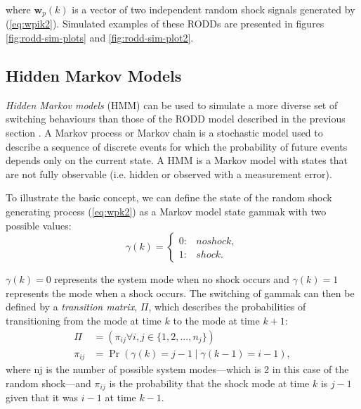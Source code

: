 where $\mathbf{w}_p(k)$ is a vector of two independent random shock signals generated by (\ref{eq:wpik2}). Simulated examples of these RODDs are presented in figures \ref{fig:rodd-sim-plots} and \ref{fig:rodd-sim-plot2}.

\subsection{Hidden Markov Models}

\textit{Hidden Markov models} (\gls{HMM}) can be used to simulate a more diverse set of switching behaviours than those of the RODD model described in the previous section \citep{wong_realistic_2009}. A Markov process or Markov chain is a stochastic model used to describe a sequence of discrete events for which the probability of future events depends only on the current state. A HMM is a Markov model with states that are not fully observable (i.e. hidden or observed with a measurement error).

To illustrate the basic concept, we can define the state of the random shock generating process (\ref{eq:wpk2}) as a Markov model state \gls{gammak} with two possible values:
\begin{equation} \label{eq:gamma-k}
	\gamma(k) = 
	\begin{cases*}
		0: & no shock, \\
		1: & shock.
	\end{cases*}
\end{equation}

 
$\gamma(k)=0$ represents the system mode when no shock occurs and $\gamma(k)=1$ represents the mode when a shock occurs. The switching of \gls{gammak} can then be defined by a \textit{transition matrix}, $\Pi$, which describes the probabilities of transitioning from the mode at time $k$ to the mode at time $k+1$:
\begin{equation} \label{eq:Pi}
	\begin{aligned}
	\Pi &= \left(\pi_{ij} \forall i,j\in \{1,2,...,n_j\}\right) \\
	\pi_{ij} &= \Pr\left( \gamma(k)=j-1 \mid \gamma(k-1)=i-1 \right),
	\end{aligned}
\end{equation}
where \gls{nj} is the number of possible system modes---which is 2 in this case of the random shock---and $\pi_{ij}$ is the probability that the shock mode at time $k$ is $j-1$ given that it was $i-1$ at time $k-1$.

